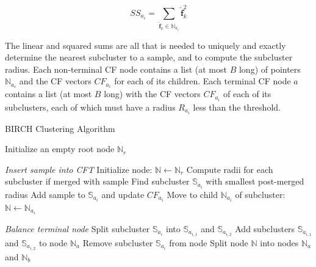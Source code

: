 \begin{equation}
\label{eqn:chap10-birch-square-sum}
SS_{a_{i}} = \displaystyle\sum\limits_{\boldsymbol{\hat{f}}_{k} \in \mathbb{N}_{a_{i}}} \boldsymbol{\hat{f}}_{k}^{2}
\end{equation}

\noindent The linear and squared sums are all that is needed to uniquely and exactly determine the nearest subcluster to a sample, and to compute the subcluster radius. Each non-terminal CF node contains a list (at most $B$ long) of pointers $\mathbb{N}_{a_{i}}$ and the CF vectors $CF_{a_{i}}$ for each of its children. Each terminal CF node $a$ contains a list (at most $B$ long) with the CF vectors $CF_{a_{i}}$ of each of its subclusters, each of which must have a radius $R_{a_{i}}$ less than the threshold.

\begin{algorithm}[h!]
\caption{BIRCH Clustering Algorithm}
\label{alg:chap10-birch}
\begin{algorithmic}[1]
  \State Initialize an empty root node $\mathbb{N}_{r}$
  
    \item[]
  
    \Statex \hspace{0.2in} \textit{Insert sample into CFT}
    \State Initialize  node: $\mathbb{N} \leftarrow \mathbb{N}_{r}$
      \State Compute radii for each subcluster if merged with sample 
      \State Find subcluster $\mathbb{S}_{a_{i}}$ with smallest post-merged radius
        \State Add sample to $\mathbb{S}_{a_{i}}$ and update $CF_{a_{i}}$ 
  	  \Else
  	    \State Move to child $\mathbb{N}_{a_{i}}$ of subcluster: $\mathbb{N} \leftarrow \mathbb{N}_{a_{i}}$
  	  \EndIf
    \EndFor

    \item[]

    \Statex \hspace{0.2in} \textit{Balance terminal node}
     
      \State Split subcluster $\mathbb{S}_{a_{i}}$ into $\mathbb{S}_{a_{i,1}}$ and $\mathbb{S}_{a_{i,2}}$
      \State Add subclusters $\mathbb{S}_{a_{i,1}}$ and $\mathbb{S}_{a_{i,2}}$ to node $\mathbb{N}_{a}$
      \State Remove subcluster $\mathbb{S}_{a_{i}}$ from node
        \State Split node $\mathbb{N}$ into nodes $\mathbb{N}_{a}$ and $\mathbb{N}_{b}$
      \EndIf
    \EndIf
    

\end{algorithmic}
\end{algorithm}
